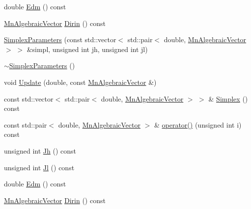 \begin{DoxyCompactItemize}
\item 
double \mbox{\hyperlink{classROOT_1_1Minuit2_1_1SimplexParameters_ad71f372dd3873cbf351dc8eddc3a9c9a}{Edm}} () const
\item 
\mbox{\hyperlink{namespaceROOT_1_1Minuit2_a62ed97730a1ca8d3fbaec64a19aa11c9}{Mn\+Algebraic\+Vector}} \mbox{\hyperlink{classROOT_1_1Minuit2_1_1SimplexParameters_a40e7b3b27280a376a063a1c81904cc75}{Dirin}} () const
\item 
\mbox{\hyperlink{classROOT_1_1Minuit2_1_1SimplexParameters_a65e9ef329f7c1be19f68e0a1b817c584}{Simplex\+Parameters}} (const std\+::vector$<$ std\+::pair$<$ double, \mbox{\hyperlink{namespaceROOT_1_1Minuit2_a62ed97730a1ca8d3fbaec64a19aa11c9}{Mn\+Algebraic\+Vector}} $>$ $>$ \&simpl, unsigned int jh, unsigned int jl)
\item 
\mbox{\hyperlink{classROOT_1_1Minuit2_1_1SimplexParameters_a13162b4c95b96890972dc24e7ba2e9a8}{$\sim$\+Simplex\+Parameters}} ()
\item 
void \mbox{\hyperlink{classROOT_1_1Minuit2_1_1SimplexParameters_aa9536cc9c7754ce308160d5e456ac54f}{Update}} (double, const \mbox{\hyperlink{namespaceROOT_1_1Minuit2_a62ed97730a1ca8d3fbaec64a19aa11c9}{Mn\+Algebraic\+Vector}} \&)
\item 
const std\+::vector$<$ std\+::pair$<$ double, \mbox{\hyperlink{namespaceROOT_1_1Minuit2_a62ed97730a1ca8d3fbaec64a19aa11c9}{Mn\+Algebraic\+Vector}} $>$ $>$ \& \mbox{\hyperlink{classROOT_1_1Minuit2_1_1SimplexParameters_a873b8883c6932b879348e73d36d86afb}{Simplex}} () const
\item 
const std\+::pair$<$ double, \mbox{\hyperlink{namespaceROOT_1_1Minuit2_a62ed97730a1ca8d3fbaec64a19aa11c9}{Mn\+Algebraic\+Vector}} $>$ \& \mbox{\hyperlink{classROOT_1_1Minuit2_1_1SimplexParameters_aa05f3fb5da27277879fad702d85bae49}{operator()}} (unsigned int i) const
\item 
unsigned int \mbox{\hyperlink{classROOT_1_1Minuit2_1_1SimplexParameters_a54250c0d286fcf4d6bbb45df037c7d85}{Jh}} () const
\item 
unsigned int \mbox{\hyperlink{classROOT_1_1Minuit2_1_1SimplexParameters_accfb7ec2b1087661ed3c31dfbb473413}{Jl}} () const
\item 
double \mbox{\hyperlink{classROOT_1_1Minuit2_1_1SimplexParameters_ad71f372dd3873cbf351dc8eddc3a9c9a}{Edm}} () const
\item 
\mbox{\hyperlink{namespaceROOT_1_1Minuit2_a62ed97730a1ca8d3fbaec64a19aa11c9}{Mn\+Algebraic\+Vector}} \mbox{\hyperlink{classROOT_1_1Minuit2_1_1SimplexParameters_a40e7b3b27280a376a063a1c81904cc75}{Dirin}} () const

\end{DoxyCompactItemize}
